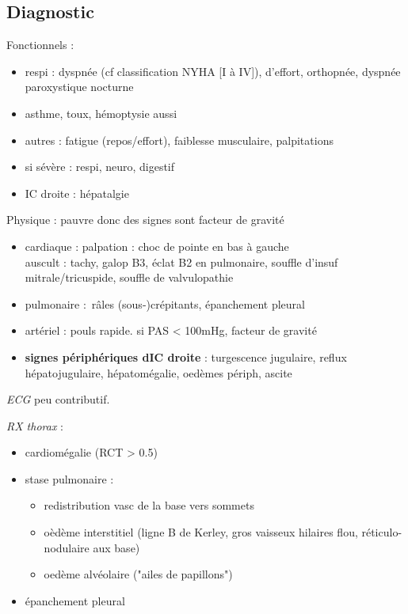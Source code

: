 \subsection{Diagnostic}
Fonctionnels :
\begin{itemize}
  \item respi : dyspnée (cf classification NYHA [I à IV]), d'effort, orthopnée, dyspnée paroxystique nocturne
  \item \danger{} asthme, toux, hémoptysie aussi 
  \item autres : fatigue (repos/effort), faiblesse musculaire, palpitations
  \item si sévère : respi, neuro, digestif
  \item IC droite : hépatalgie
\end{itemize}
Physique : pauvre donc des signes sont facteur de gravité
\begin{itemize}
  \item cardiaque : palpation : choc de pointe en bas à gauche\\
    auscult : tachy, galop B3, éclat B2 en pulmonaire, souffle d'insuf
    mitrale/tricuspide, souffle de valvulopathie
  \item pulmonaire : râles (sous-)crépitants, épanchement pleural
  \item artériel : pouls rapide. si PAS < 100mHg, facteur de gravité
  \item \textbf{signes périphériques dIC droite} : turgescence jugulaire, reflux
    hépatojugulaire, hépatomégalie, oedèmes périph, ascite
\end{itemize}

\textit{ECG}  peu contributif.

\textit{RX thorax}  :
\begin{itemize}
  \item cardiomégalie (RCT > 0.5)
  \item stase pulmonaire :
    \begin{itemize}
      \item redistribution vasc de la base vers sommets
      \item oèdème interstitiel (ligne B de Kerley, gros vaisseux hilaires flou,
        réticulo-nodulaire aux base)
      \item oedème alvéolaire ("ailes de papillons")
    \end{itemize}
  \item épanchement pleural
\end{itemize}

